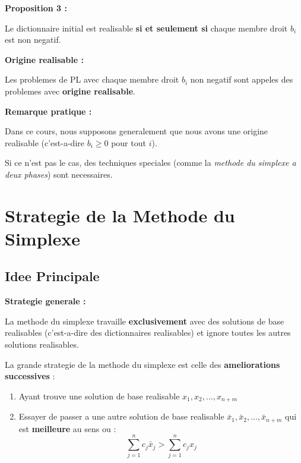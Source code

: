 \documentclass[12pt,a4paper]{article}
\begin{document}
\begin{important}
\textbf{Proposition 3 :}

Le dictionnaire initial est realisable \textcolor{importantrouge}{\textbf{si et seulement si}} chaque membre droit $b_i$ est non negatif.
\end{important}

\begin{definition}
\textbf{Origine realisable :}

Les problemes de PL avec chaque membre droit $b_i$ non negatif sont appeles des problemes avec \textcolor{titrebleu}{\textbf{origine realisable}}.
\end{definition}

\begin{notecours}
\textbf{Remarque pratique :}

Dans ce cours, nous supposons generalement que nous avons une origine realisable (c'est-a-dire $b_i \geq 0$ pour tout $i$).

Si ce n'est pas le cas, des techniques speciales (comme la \textit{methode du simplexe a deux phases}) sont necessaires.
\end{notecours}

\newpage
\section{Strategie de la Methode du Simplexe}

\subsection{Idee Principale}

\begin{important}
\textbf{Strategie generale :}

La methode du simplexe travaille \textcolor{importantrouge}{\textbf{exclusivement}} avec des solutions de base realisables (c'est-a-dire des dictionnaires realisables) et ignore toutes les autres solutions realisables.

La grande strategie de la methode du simplexe est celle des \textcolor{defvert}{\textbf{ameliorations successives}} :

\begin{enumerate}
    \item Ayant trouve une solution de base realisable $x_1, x_2, \ldots, x_{n+m}$
    
    \item Essayer de passer a une autre solution de base realisable $\bar{x}_1, \bar{x}_2, \ldots, \bar{x}_{n+m}$ qui est \textcolor{titrebleu}{\textbf{meilleure}} au sens ou :
    $$\sum_{j=1}^{n} c_j\bar{x}_j > \sum_{j=1}^{n} c_jx_j$$
\end{enumerate}
\end{important}
\end{document}

